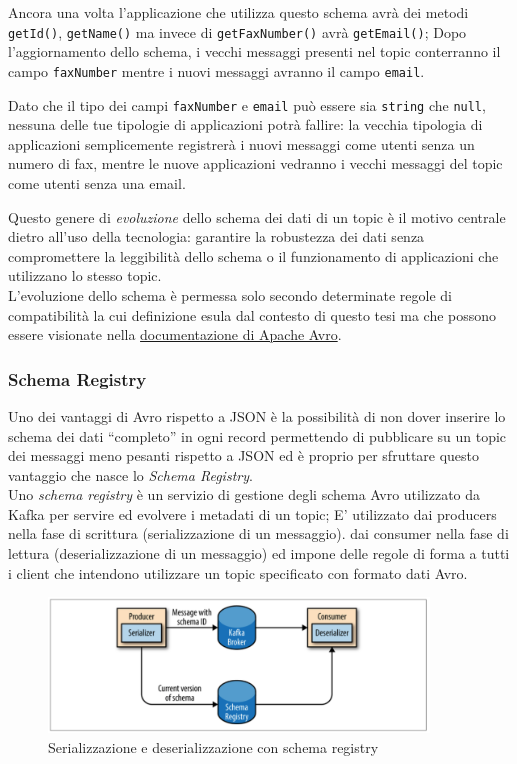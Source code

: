 \documentclass[]{article}
\begin{document}
\normalsize

Ancora una volta l'applicazione che utilizza questo schema avrà dei
metodi \texttt{getId()}, \texttt{getName()} ma invece di
\texttt{getFaxNumber()} avrà \texttt{getEmail()}; Dopo l'aggiornamento
dello schema, i vecchi messaggi presenti nel topic conterranno il campo
\texttt{faxNumber} mentre i nuovi messaggi avranno il campo
\texttt{email}.

Dato che il tipo dei campi \texttt{faxNumber} e \texttt{email} può
essere sia \texttt{string} che \texttt{null}, nessuna delle tue
tipologie di applicazioni potrà fallire: la vecchia tipologia di
applicazioni semplicemente registrerà i nuovi messaggi come utenti senza
un numero di fax, mentre le nuove applicazioni vedranno i vecchi
messaggi del topic come utenti senza una email.

Questo genere di \emph{evoluzione} dello schema dei dati di un topic è
il motivo centrale dietro all'uso della tecnologia: garantire la
robustezza dei dati senza compromettere la leggibilità dello schema o il
funzionamento di applicazioni che utilizzano lo stesso topic.\\
L'evoluzione dello schema è permessa solo secondo determinate regole di
compatibilità la cui definizione esula dal contesto di questo tesi ma
che possono essere visionate nella
\href{https://avro.apache.org/docs/1.7.7/spec.html\#Schema+Resolution}{documentazione
di Apache Avro}.

\newpage

\subsubsection{Schema Registry}\label{schema-registry}

Uno dei vantaggi di Avro rispetto a JSON è la possibilità di non dover
inserire lo schema dei dati ``completo'' in ogni record permettendo di
pubblicare su un topic dei messaggi meno pesanti rispetto a JSON ed è
proprio per sfruttare questo vantaggio che nasce lo \emph{Schema
Registry}.\\
Uno \emph{schema registry} è un servizio di gestione degli schema Avro
utilizzato da Kafka per servire ed evolvere i metadati di un topic; E'
utilizzato dai producers nella fase di scrittura (serializzazione di un
messaggio). dai consumer nella fase di lettura (deserializzazione di un
messaggio) ed impone delle regole di forma a tutti i client che
intendono utilizzare un topic specificato con formato dati Avro.

\begin{figure}
\centering
\includegraphics[width=0.90000\textwidth]{../images/schema-registry.png}
\caption{Serializzazione e deserializzazione con schema registry
\label{figure_5}}
\end{figure}
\end{document}
